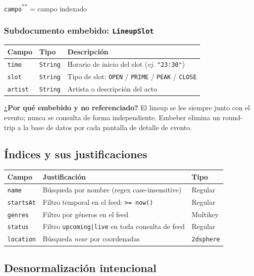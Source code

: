 \documentclass[12pt, a4paper]{article}
\newcommand{\code}[1]{\texttt{#1}}
\newcommand{\idx}[1]{\texttt{#1}\textsuperscript{*}} %
\begin{document}
{\footnotesize \idx{campo}\textsuperscript{*} = campo indexado}

\subsubsection{Subdocumento embebido: \code{LineupSlot}}

\begin{tabularx}{\textwidth}{@{}llX@{}}
  \toprule
  \textbf{Campo}  & \textbf{Tipo}   & \textbf{Descripción} \\
  \midrule
  \code{time}     & \code{String}   & Horario de inicio del slot (\emph{ej.} \code{"23:30"}) \\
  \code{slot}     & \code{String}   & Tipo de slot: \code{OPEN} / \code{PRIME} / \code{PEAK} / \code{CLOSE} \\
  \code{artist}   & \code{String}   & Artista o descripción del acto \\
  \bottomrule
\end{tabularx}

\vspace{0.5em}
\textbf{¿Por qué embebido y no referenciado?}
El lineup se lee siempre junto con el evento; nunca se consulta de forma
independiente. Embeber elimina un round-trip a la base de datos por cada
pantalla de detalle de evento.

\subsection{Índices y sus justificaciones}

\begin{tabularx}{\textwidth}{@{}lXl@{}}
  \toprule
  \textbf{Campo}  & \textbf{Justificación} & \textbf{Tipo} \\
  \midrule
  \code{name}        & Búsqueda por nombre (regex case-insensitive) & Regular \\
  \code{startsAt}    & Filtro temporal en el feed: \code{>= now()} & Regular \\
  \code{genres}      & Filtro por géneros en el feed & Multikey \\
  \code{status}      & Filtro \code{upcoming|live} en toda consulta de feed & Regular \\
  \code{location}    & Búsqueda \emph{near} por coordenadas & \code{2dsphere} \\
  \bottomrule
\end{tabularx}

\subsection{Desnormalización intencional}
\end{document}
